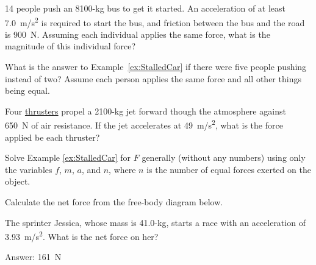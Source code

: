 \documentclass{article}
\begin{document}
\begin{exercise} \label{w6N0j0}
14 people push an 8100-kg bus to get it started. An acceleration of at least \SI{7.0}{m/s^2} is required to start the bus, and friction between the bus and the road is \SI{900}{N}. Assuming each individual applies the same force, what is the magnitude of this individual force?
\end{exercise}

\begin{exercise} \label{WHMhQG}
    What is the answer to Example~\ref{ex:StalledCar} if there were five people pushing instead of two? Assume each person applies the same force and all other things being equal.
\end{exercise}

\begin{exercise} \label{DV094w}
Four \href{https://en.wikipedia.org/wiki/Spacecraft_propulsion#/media/File:Shuttle_Main_Engine_Test_Firing.jpg}{thrusters} propel a 2100-kg jet forward though the atmosphere against \SI{650}{N} of air resistance. If the jet accelerates at \SI{49}{m/s^2}, what is the force applied be each thruster? 
\end{exercise}

\begin{exercise} \label{e1ANRE}
Solve Example \ref{ex:StalledCar} for $F$ generally (without any numbers) using only the variables $f$, $m$, $a$, and $n$, where $n$ is the number of equal forces exerted on the object.
\end{exercise}




\begin{exercise}
Calculate the net force from the free-body diagram below.


\begin{center}
\end{center}
\end{exercise}

\begin{exercise}
The sprinter Jessica, whose mass is 41.0-kg, starts a race with an acceleration of \SI{3.93}{m/s^2}. What is the net force on her?


{\color{red} Answer: \SI{161}{N}}

\end{exercise}
\end{document}
